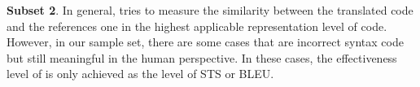 \textbf{Subset 2}. In general, {\model} tries to measure the similarity between the translated code 
and the references one in the highest applicable representation level of code. However, in our sample 
set, there are some cases that are incorrect syntax code but still meaningful in the human perspective. 
In these cases, the effectiveness level of {\model} is only achieved as the level of STS or BLEU. 



